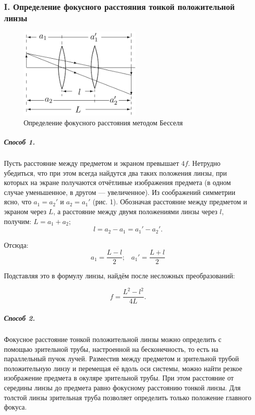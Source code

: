 \documentclass[12pt,a4paper]{article}
\begin{document}
	\subsubsection*{I. Определение фокусного расстояния тонкой положительной линзы}
	
	\begin{figure}[h!]
		\centering
		\includegraphics[width=6cm]{res/bessel.png}
		\caption{Определение фокусного расстояния методом Бесселя}
	\end{figure}

	\subparagraph{Способ 1.} Пусть расстояние между предметом и экраном превышает $4f$. Нетрудно убедиться, что при этом всегда найдутся два таких положения линзы, при которых на экране получаются отчётливые изображения предмета (в одном случае уменьшенное, в другом — увеличенное). Из соображений симметрии ясно, что $a_1 = a_2'$ и $a_2 = a_1'$ (рис. 1). Обозначая расстояние между предметом и экраном через $L$, а расстояние между двумя положениями линзы через $l$, получим: $L = a_1 + a_2$; 
    \begin{equation}
        l = a_2 - a_1 = a_1' - a_2'.
        \label{eq:1}
    \end{equation}
    
    Отсюда:
	\begin{equation}
		a_1 = \frac{L - l}{2}; \;\;\; a_1' = \frac{L+l}{2}
	\end{equation}
	
	Подставляя это в формулу линзы, найдём после несложных преобразований:
	
	\begin{equation}
		f = \frac{L^2 - l^2}{4L}.
        \label{eq:2}
	\end{equation}
	
	\subparagraph{Способ 2.} Фокусное расстояние тонкой положительной линзы можно определить с помощью зрительной трубы, настроенной на бесконечность, то есть на параллельный пучок лучей. Разместив между предметом и зрительной трубой положительную линзу и перемещая её вдоль оси системы, можно найти резкое изображение предмета в окуляре зрительной трубы. При этом расстояние от середины линзы до предмета равно фокусному расстоянию тонкой линзы. Для толстой линзы зрительная труба позволяет определить только положение главного фокуса.
	
\end{document}

